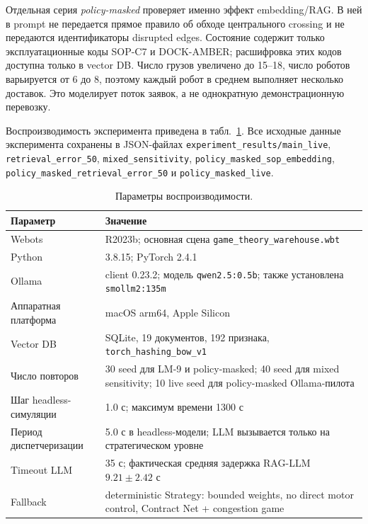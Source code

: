 \documentclass[runningheads]{llncs}
\begin{document}
Отдельная серия \textit{policy-masked} проверяет именно эффект embedding/RAG. В ней в prompt не передается прямое правило об обходе центрального crossing и не передаются идентификаторы disrupted edges. Состояние содержит только эксплуатационные коды SOP-C7 и DOCK-AMBER; расшифровка этих кодов доступна только в vector DB. Число грузов увеличено до 15--18, число роботов варьируется от 6 до 8, поэтому каждый робот в среднем выполняет несколько доставок. Это моделирует поток заявок, а не однократную демонстрационную перевозку.

Воспроизводимость эксперимента приведена в табл.~\ref{tab:repro}. Все исходные данные эксперимента сохранены в JSON-файлах \texttt{experiment\_results/main\_live}, \texttt{retrieval\_error\_50}, \texttt{mixed\_sensitivity}, \texttt{policy\_masked\_sop\_embedding}, \texttt{policy\_masked\_retrieval\_error\_50} и \texttt{policy\_masked\_live}.

\begin{table}[!htbp]
\centering
\caption{Параметры воспроизводимости.}
\label{tab:repro}
\scriptsize
\begin{tabular}{p{}p{}}
\toprule
Параметр & Значение \\
\midrule
Webots & R2023b; основная сцена \texttt{game\_theory\_warehouse.wbt} \\
Python & 3.8.15; PyTorch 2.4.1 \\
Ollama & client 0.23.2; модель \texttt{qwen2.5:0.5b}; также установлена \texttt{smollm2:135m} \\
Аппаратная платформа & macOS arm64, Apple Silicon \\
Vector DB & SQLite, 19 документов, 192 признака, \texttt{torch\_hashing\_bow\_v1} \\
Число повторов & 30 seed для LM-9 и policy-masked; 40 seed для mixed sensitivity; 10 live seed для policy-masked Ollama-пилота \\
Шаг headless-симуляции & 1.0 с; максимум времени 1300 с \\
Период диспетчеризации & 5.0 с в headless-модели; LLM вызывается только на стратегическом уровне \\
Timeout LLM & 35 с; фактическая средняя задержка RAG-LLM $9.21\pm2.42$ с \\
Fallback & deterministic Strategy: bounded weights, no direct motor control, Contract Net + congestion game \\
\bottomrule
\end{tabular}
\end{table}
\end{document}
